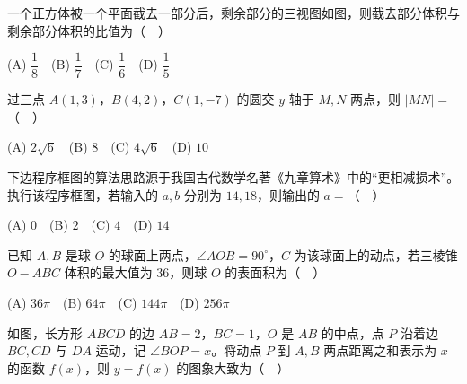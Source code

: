 \begin{question}
一个正方体被一个平面截去一部分后，剩余部分的三视图如图，则截去部分体积与剩余部分体积的比值为（　）
\nopagebreak[4]
\begin{center}\end{center}
\nopagebreak[4]
(A) $\dfrac18$　(B) $\dfrac17$　(C) $\dfrac16$　(D) $\dfrac15$

\end{question}
\begin{question}
过三点 $A(1,3)$，$B(4,2)$，$C(1,-7)$ 的圆交 $y$ 轴于 $M,N$ 两点，则 $|MN|=$（　）

(A) $2\sqrt6$　(B) $8$　(C) $4\sqrt6$　(D) $10$

\Needspace{0.4\textheight}
\end{question}
\begin{question}
下边程序框图的算法思路源于我国古代数学名著《九章算术》中的“更相减损术”。执行该程序框图，若输入的 $a,b$ 分别为 $14,18$，则输出的 $a=$（　）
\nopagebreak[4]
\begin{center}\end{center}
\nopagebreak[4]
(A) $0$　(B) $2$　(C) $4$　(D) $14$

\end{question}
\begin{question}
已知 $A,B$ 是球 $O$ 的球面上两点，$\angle AOB=90^\circ$，$C$ 为该球面上的动点，若三棱锥 $O-ABC$ 体积的最大值为 $36$，则球 $O$ 的表面积为（　）

(A) $36\pi$　(B) $64\pi$　(C) $144\pi$　(D) $256\pi$

\Needspace{0.4\textheight}
\end{question}
\begin{question}
如图，长方形 $ABCD$ 的边 $AB=2$，$BC=1$，$O$ 是 $AB$ 的中点，点 $P$ 沿着边 $BC,CD$ 与 $DA$ 运动，记 $\angle BOP=x$。将动点 $P$ 到 $A,B$ 两点距离之和表示为 $x$ 的函数 $f(x)$，则 $y=f(x)$ 的图象大致为（　）
\nopagebreak[4]
\begin{center}\end{center}
\nopagebreak[4]
\nopagebreak[4]
\begin{center}\end{center}
\nopagebreak[4]
\nopagebreak[4]
\begin{center}\end{center}
\nopagebreak[4]
\nopagebreak[4]
\begin{center}\end{center}
\nopagebreak[4]
\nopagebreak[4]
\begin{center}\end{center}
\nopagebreak[4]
\end{question}
